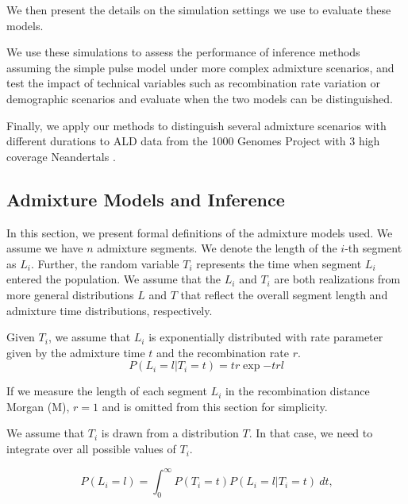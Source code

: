 \documentclass[]{article}
\begin{document}
We then present the details on the simulation settings we use to evaluate these models.

We use these simulations to assess the performance of inference methods assuming the simple pulse model under more complex admixture scenarios, and test the impact of technical variables such as recombination rate variation or demographic scenarios and evaluate when the two models can be distinguished.

Finally, we apply our methods to distinguish several admixture scenarios with different durations to ALD data from the 1000 Genomes Project \citep{the_1000_genomes_project_consortium_global_2015} with 3 high coverage Neandertals \citep{prufer_complete_2013,prufer_high-coverage_2017,mafessoni_high_coverage_2020}.


\subsection{Admixture Models and Inference}\label{admixture models}

In this section, we present formal definitions of the admixture models used.  We assume we have $n$ admixture segments. We denote the length of the $i$-th segment as $L_i$. Further, the random variable $T_i$ represents the time when segment $L_i$ entered the population. We assume that the $L_i$ and $T_i$ are both realizations from more general distributions $L$ and $T$ that reflect the overall segment length and admixture time distributions, respectively. 

Given $T_i$, we assume that $L_i$ is exponentially distributed with rate parameter given by the admixture time $t$ and the recombination rate $r$.
\begin{equation}
\label{eq:generall_length_distribution}
    P(L_i=l|T_i=t) = t r\exp{-t r l} 
\end{equation}

If we measure the length of each segment $L_i$ in the recombination distance Morgan (M), $r=1$ and is omitted from this section for simplicity.

We assume that  $T_i$ is drawn from a distribution $T$. In that case, we need to integrate over all possible values of $T_i$. 

\begin{equation}
\label{eq:standard_likelihood_definintion}
    P(L_i=l)=\int_{0}^{\infty} P(T_i=t) P(L_i=l | T_i=t) \ dt \text{,}
\end{equation}
\end{document}
